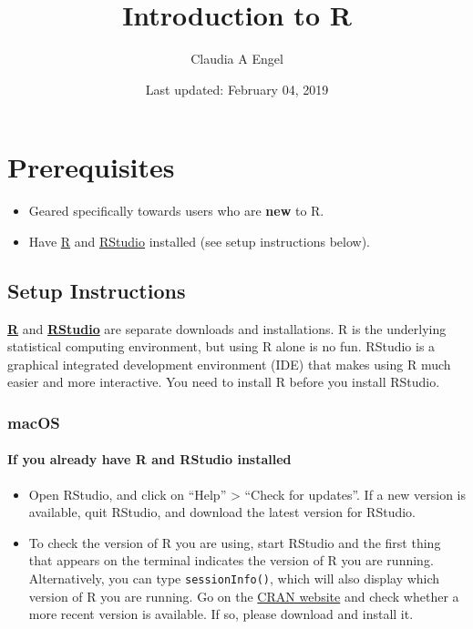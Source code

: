 \documentclass[]{book}
\title{Introduction to R}
\author{Claudia A Engel}
\date{Last updated: February 04, 2019}
\providecommand{\tightlist}{%
  \setlength{\itemsep}{0pt}\setlength{\parskip}{0pt}}
\begin{document}
\maketitle

{
\setcounter{tocdepth}{1}
\tableofcontents
}
\chapter*{Prerequisites}\label{prerequisites}

\begin{itemize}
\tightlist
\item
  Geared specifically towards users who are \textbf{new} to R.\\
\item
  Have \href{https://cran.r-project.org/}{R} and
  \href{https://www.rstudio.com/}{RStudio} installed (see setup
  instructions below).
\end{itemize}

\section*{Setup Instructions}\label{setup-instructions}

\href{https://cran.r-project.org/}{\textbf{R}} and
\href{https://www.rstudio.com/}{\textbf{RStudio}} are separate downloads
and installations. R is the underlying statistical computing
environment, but using R alone is no fun. RStudio is a graphical
integrated development environment (IDE) that makes using R much easier
and more interactive. You need to install R before you install RStudio.

\subsection*{macOS}\label{macos}

\subsubsection*{If you already have R and RStudio
installed}\label{if-you-already-have-r-and-rstudio-installed}

\begin{itemize}
\tightlist
\item
  Open RStudio, and click on ``Help'' \textgreater{} ``Check for
  updates''. If a new version is available, quit RStudio, and download
  the latest version for RStudio.
\item
  To check the version of R you are using, start RStudio and the first
  thing that appears on the terminal indicates the version of R you are
  running. Alternatively, you can type \texttt{sessionInfo()}, which
  will also display which version of R you are running. Go on the
  \href{https://cran.r-project.org/bin/macosx/}{CRAN website} and check
  whether a more recent version is available. If so, please download and
  install it.
\end{itemize}
\end{document}

